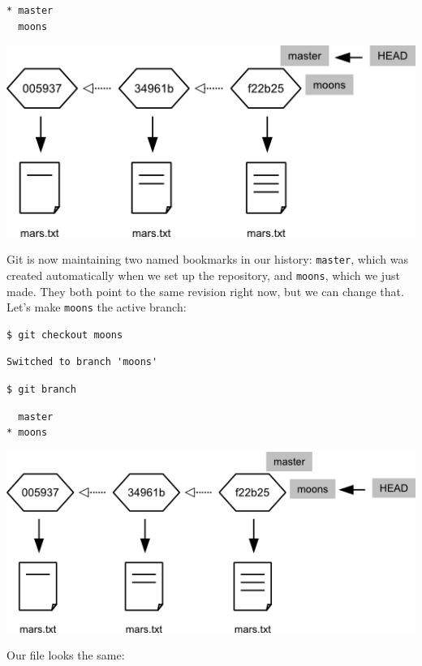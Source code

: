 \documentclass{book}
\begin{document}
\begin{verbatim}
* master
  moons
\end{verbatim}

\includegraphics{novice/extras/img/git-branching-02.png}

Git is now maintaining two named bookmarks in our history:
\texttt{master}, which was created automatically when we set up the
repository, and \texttt{moons}, which we just made. They both point to
the same revision right now, but we can change that. Let's make
\texttt{moons} the active branch:

\begin{verbatim}
$ git checkout moons
\end{verbatim}

\begin{verbatim}
Switched to branch 'moons'
\end{verbatim}

\begin{verbatim}
$ git branch
\end{verbatim}

\begin{verbatim}
  master
* moons
\end{verbatim}

\includegraphics{novice/extras/img/git-branching-03.png}

Our file looks the same:
\end{document}

